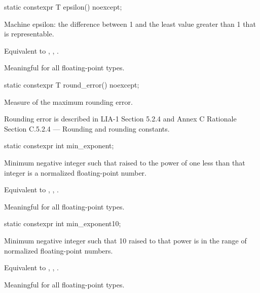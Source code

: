 %
\begin{itemdecl}
static constexpr T epsilon() noexcept;
\end{itemdecl}

\begin{itemdescr}
\pnum
Machine epsilon:  the difference between 1 and the least value greater than 1
that is representable.
\begin{footnote}
Equivalent to , , .
\end{footnote}

\pnum
Meaningful for all floating-point types.
\end{itemdescr}

%
\begin{itemdecl}
static constexpr T round_error() noexcept;
\end{itemdecl}

\begin{itemdescr}
\pnum
Measure of the maximum rounding error.
\begin{footnote}
Rounding error is described in
LIA-1
Section 5.2.4 and
Annex C Rationale Section C.5.2.4 --- Rounding and rounding constants.
\end{footnote}
\end{itemdescr}

%
\begin{itemdecl}
static constexpr int  min_exponent;
\end{itemdecl}

\begin{itemdescr}
\pnum
Minimum negative integer such that
raised to the power of one less than that integer is a normalized floating-point
number.
\begin{footnote}
Equivalent to , ,
.
\end{footnote}

\pnum
Meaningful for all floating-point types.
\end{itemdescr}

%
\begin{itemdecl}
static constexpr int  min_exponent10;
\end{itemdecl}

\begin{itemdescr}
\pnum
Minimum negative integer such that 10 raised to that power is in the range
of normalized floating-point numbers.
\begin{footnote}
Equivalent to
, , .
\end{footnote}

\pnum
Meaningful for all floating-point types.
\end{itemdescr}

